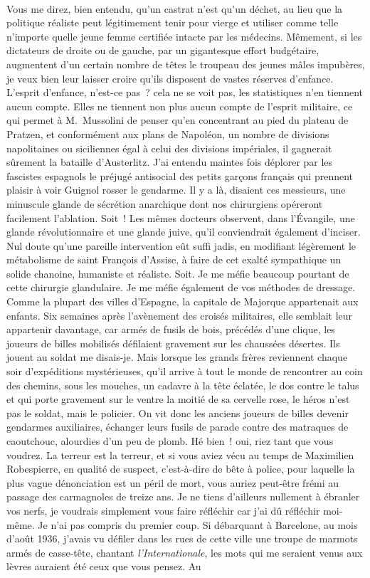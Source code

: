 \documentclass[french,twoside]{book} %
\begin{document}
\noindent  \par
Vous me direz, bien entendu, qu’un castrat n’est qu’un déchet, au lieu que la politique réaliste peut légitimement tenir pour vierge et utiliser comme telle n’importe quelle jeune femme certifiée intacte par les médecins. Mêmement, si les dictateurs de droite ou de gauche, par un gigantesque effort budgétaire, augmentent d’un certain nombre de têtes le troupeau des jeunes mâles impubères, je veux bien leur laisser croire qu’ils disposent de vastes réserves d’enfance. L’esprit d’enfance, n’est-ce pas ? cela ne se voit pas, les statistiques n’en tiennent aucun compte. Elles ne tiennent non plus aucun compte de l’esprit militaire, ce qui permet à M. Mussolini de penser qu’en concentrant au pied du plateau de Pratzen, et conformément aux plans de Napoléon, un nombre de divisions napolitaines ou siciliennes égal à celui des divisions impériales, il gagnerait sûrement la bataille d’Austerlitz. J’ai entendu maintes fois déplorer par les fascistes espagnols le préjugé antisocial des petits garçons français qui prennent plaisir à voir Guignol rosser le gendarme. Il y a là, disaient ces messieurs, une minuscule glande de sécrétion anarchique dont nos chirurgiens opéreront facilement l’ablation. Soit ! Les mêmes docteurs observent, dans l’Évangile, une glande révolutionnaire et une glande juive, qu’il conviendrait également d’inciser. Nul doute qu’une pareille intervention eût suffi jadis, en modifiant légèrement le métabolisme de saint François d’Assise, à faire de cet exalté sympathique un solide chanoine, humaniste et réaliste. Soit. Je me méfie beaucoup pourtant de cette chirurgie glandulaire. Je me méfie également de vos méthodes de dressage. Comme la plupart des villes d’Espagne, la capitale de Majorque appartenait aux enfants. Six semaines après l’avènement des croisés militaires, elle semblait leur appartenir davantage, car armés de fusils de bois, précédés d’une clique, les joueurs de billes mobilisés défilaient gravement sur les chaussées désertes. Ils jouent au soldat me disais-je. Mais lorsque les grands frères reviennent chaque soir d’expéditions mystérieuses, qu’il arrive à tout le monde de rencontrer au coin des chemins, sous les mouches, un cadavre à la tête éclatée, le dos contre le talus et qui porte gravement sur le ventre la moitié de sa cervelle rose, le héros n’est pas le soldat, mais le policier. On vit donc les anciens joueurs de billes devenir gendarmes auxiliaires, échanger leurs fusils de parade contre des matraques de caoutchouc, alourdies d’un peu de plomb. Hé bien ! oui, riez tant que vous voudrez. La terreur est la terreur, et si vous aviez vécu au temps de Maximilien Robespierre, en qualité de suspect, c’est-à-dire de bête à police, pour laquelle la plus vague dénonciation est un péril de mort, vous auriez peut-être frémi au passage des carmagnoles de treize ans. Je ne tiens d’ailleurs nullement à ébranler vos nerfs, je voudrais simplement vous faire réfléchir car j’ai dû réfléchir moi-même. Je n’ai pas compris du premier coup. Si débarquant à Barcelone, au mois d’août 1936, j’avais vu défiler dans les rues de cette ville une troupe de marmots armés de casse-tête, chantant \emph{l’Internationale}, les mots qui me seraient venus aux lèvres auraient été ceux que vous pensez. Au 
\end{document}
